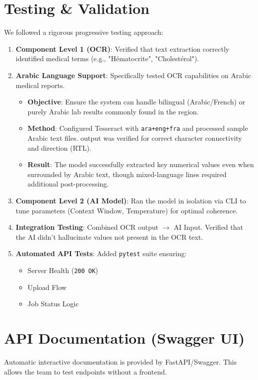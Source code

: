 \documentclass{article}
\begin{document}
\section{Testing \& Validation}
We followed a rigorous progressive testing approach:

\begin{enumerate}
    \item \textbf{Component Level 1 (OCR)}: Verified that text extraction correctly identified medical terms (e.g., "Hématocrite", "Cholestérol").
    \item \textbf{Arabic Language Support}: Specifically tested OCR capabilities on Arabic medical reports.
    \begin{itemize}
        \item \textbf{Objective}: Ensure the system can handle bilingual (Arabic/French) or purely Arabic lab results commonly found in the region.
        \item \textbf{Method}: Configured Tesseract with \texttt{ara+eng+fra} and processed sample Arabic text files. output was verified for correct character connectivity and direction (RTL).
        \item \textbf{Result}: The model successfully extracted key numerical values even when surrounded by Arabic text, though mixed-language lines required additional post-processing.
    \end{itemize}
    \item \textbf{Component Level 2 (AI Model)}: Ran the model in isolation via CLI to tune parameters (Context Window, Temperature) for optimal coherence.
    \item \textbf{Integration Testing}: Combined OCR output $\rightarrow$ AI Input. Verified that the AI didn't hallucinate values not present in the OCR text.
    \item \textbf{Automated API Tests}: Added \texttt{pytest} suite ensuring:
    \begin{itemize}
        \item Server Health (\texttt{200 OK})
        \item Upload Flow
        \item Job Status Logic
    \end{itemize}
\end{enumerate}

\section{API Documentation (Swagger UI)}
Automatic interactive documentation is provided by FastAPI/Swagger. This allows the team to test endpoints without a frontend.
\end{document}
